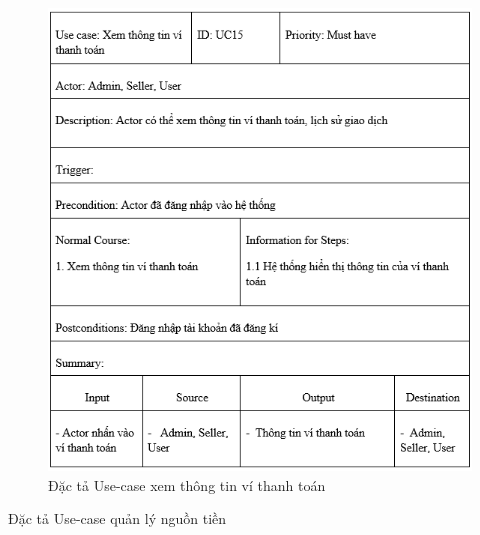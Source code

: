 \documentclass{article}
\begin{document}
{{{{{{{{{{{{{{{	\begin{center}
		\begin{figure}[htp]
			\begin{center}
				\includegraphics[scale=.930]{anh25.png}
			\end{center}
			\caption{Đặc tả Use-case xem thông tin ví thanh toán}
			
		\end{figure}
	\end{center}
	
	
\newpage
{\large Đặc tả Use-case quản lý nguồn tiền
	
}}}}}}}}}}}}}}}}
\end{document}
